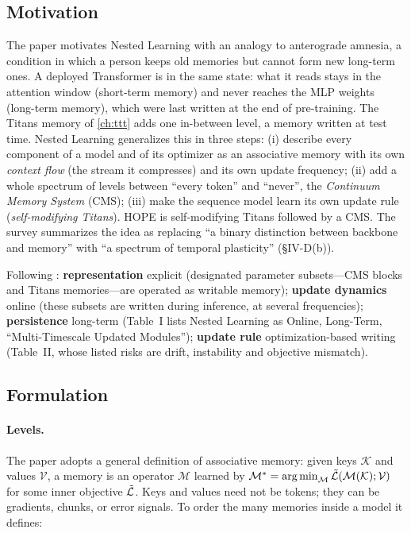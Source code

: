 \subsection{Motivation}\label{sec:c11-nl-motivation}

The paper motivates Nested Learning with an analogy to anterograde amnesia, a condition in which
a person keeps old memories but cannot form new long-term ones. A deployed Transformer is in the
same state: what it reads stays in the attention window (short-term memory) and never reaches
the MLP weights (long-term memory), which were last written at the end of pre-training. The
Titans memory of \cref{ch:ttt} adds one in-between level, a memory written at test time. Nested
Learning generalizes this in three steps: (i) describe every component of a model and of its
optimizer as an associative memory with its own \emph{context flow} (the stream it compresses)
and its own update frequency; (ii) add a whole spectrum of levels between ``every token'' and
``never'', the \emph{Continuum Memory System} (CMS); (iii) make the sequence model learn its own
update rule (\emph{self-modifying Titans}). HOPE is self-modifying Titans followed by a CMS. The
survey summarizes the idea as replacing ``a binary distinction between backbone and memory'' with
``a spectrum of temporal plasticity'' (\S IV-D(b)).

\begin{taxonomy}
Following \citet{zhoubian2026memory}: \textbf{representation} explicit (designated parameter
subsets---CMS blocks and Titans memories---are operated as writable memory);
\textbf{update dynamics} online (these subsets are written during inference, at several
frequencies); \textbf{persistence} long-term (Table~I lists Nested Learning as Online, Long-Term,
``Multi-Timescale Updated Modules''); \textbf{update rule} optimization-based writing (Table~II,
whose listed risks are drift, instability and objective mismatch).
\end{taxonomy}

\subsection{Formulation}\label{sec:c11-nl-formulation}

\paragraph{Levels.} The paper adopts a general definition of associative memory: given keys
$\mathcal{K}$ and values $\mathcal{V}$, a memory is an operator $\mathcal{M}$ learned by
$\mathcal{M}^* = \operatorname*{arg\,min}_{\mathcal{M}}\tilde{\mathcal{L}}(\mathcal{M}(\mathcal{K});\mathcal{V})$ for some
inner objective $\tilde{\mathcal{L}}$. Keys and values need not be tokens; they can be gradients, chunks,
or error signals. To order the many memories inside a model it defines:

